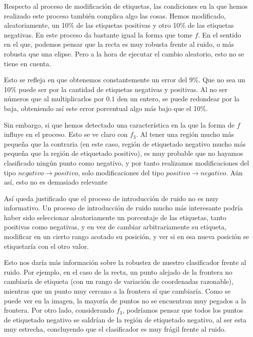 \documentclass[11pt]{article}
\begin{document}
Respecto al proceso de modificación de etiquetas, las condiciones en la que hemos realizado este proceso también complica algo las cosas. Hemos modificado, aleatoriamente, un 10\% de las etiquetas positivas y otro 10\% de las etiquetas negativas. En este proceso da bastante igual la forma que tome $f$. En el sentido en el que, podemos pensar que la recta es muy robusta frente al ruido, o más robusta que una elipse. Pero a la hora de ejecutar el cambio aleatorio, esto no se tiene en cuenta.

Esto se refleja en que obtenemos constantemente un error del 9\%. Que no sea un 10\% puede ser por la cantidad de etiquetas negativas y positivas. Al no ser números que al multiplicarlos por $0.1$ den un entero, se puede redondear por la baja, obteniendo así este error porcentual algo más bajo que el 10\%.

Sin embargo, si que hemos detectado una característica en la que la forma de $f$ influye en el proceso. Esto se ve claro con $f_3$. Al tener una región mucho más pequeña que la contraria (en este caso, región de etiquetado negativo mucho más pequeña que la región de etiquetado positivo), es muy probable que no hayamos clasificado ningún punto como negativo, y por tanto realizamos modificaciones del tipo $negativo \rightarrow positivo$, solo modificaciones del tipo $positivo \rightarrow negativo$. Aún así, esto no es demasiado relevante

Así queda justificado que el proceso de introducción de ruido no es muy informativo. Un proceso de introducción de ruido mucho más interesante podría haber sido seleccionar aleatoriamente un porcentaje de las etiquetas, tanto positivas como negativas, y en vez de cambiar arbitrariamente su etiqueta, modificar en un cierto rango acotado su posición, y ver si en esa nueva posición se etiquetaría con el otro valor.

Esto nos daría más información sobre la robustez de nuestro clasificador frente al ruido. Por ejemplo, en el caso de la recta, un punto alejado de la frontera no cambiaría de etiqueta (con un rango de variación de coordenadas razonable), mientras que un punto muy cercano a la frontera sí que cambiaría. Como se puede ver en la imagen, la mayoría de puntos no se encuentran muy pegados a la frontera. Por otro lado, considerando $f_3$, podríamos pensar que todos los puntos de etiquetado negativo se saldrían de la región de etiquetado negativo, al ser esta muy estrecha, concluyendo que el clasificador es muy frágil frente al ruido.
\end{document}
